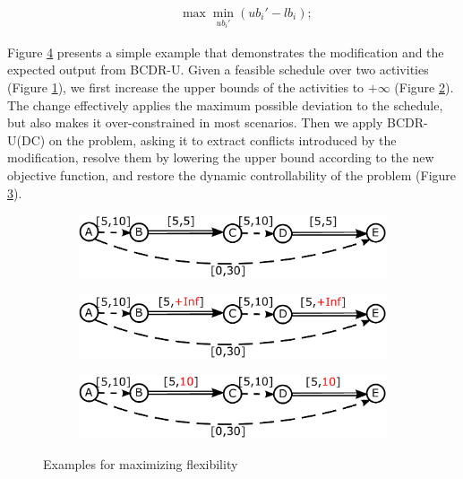 \documentclass[jair,twoside,11pt,theapa]{article}
\begin{document}
\begin{align}
&\phantom{=}	\max\min_{ub_i'}{(ub_i' - lb_i)};
\label{eqn:max_flex_obj}
\end{align}


Figure \ref{fig:RCPSP_reform} presents a simple example that demonstrates the
modification and the expected output from BCDR-U. Given a feasible schedule over
two activities (Figure \ref{fig:RCPSP_reform1}), we first increase the upper
bounds of the activities to $+\infty$ (Figure \ref{fig:RCPSP_reform2}). The
change effectively applies the maximum possible deviation to the schedule, but
also makes it over-constrained in most scenarios.
Then we apply BCDR-U(DC) on the problem, asking it to extract conflicts introduced by
the modification, resolve them by lowering the upper bound according to the new
objective function, and restore the dynamic controllability of the problem
(Figure \ref{fig:RCPSP_reform3}).


\begin{figure}[h!]
	\centering
	\begin{subfigure}[b]{0.6\textwidth}
		\includegraphics[width=\textwidth]{figures/RCPSP_reformulation/example_cctpu.pdf}
		\caption{}
		\label{fig:RCPSP_reform1}
	\end{subfigure}
	\begin{subfigure}[b]{0.6\textwidth}
		\includegraphics[width=\textwidth]{figures/RCPSP_reformulation/example_cctpu2.pdf}
		\caption{}
		\label{fig:RCPSP_reform2}
	\end{subfigure}
	\begin{subfigure}[b]{0.6\textwidth}
		\includegraphics[width=\textwidth]{figures/RCPSP_reformulation/example_cctpu3.pdf}
		\caption{}
		\label{fig:RCPSP_reform3}
	\end{subfigure}
	\caption{Examples for maximizing flexibility}
	\label{fig:RCPSP_reform}
\end{figure} 
\end{document}
